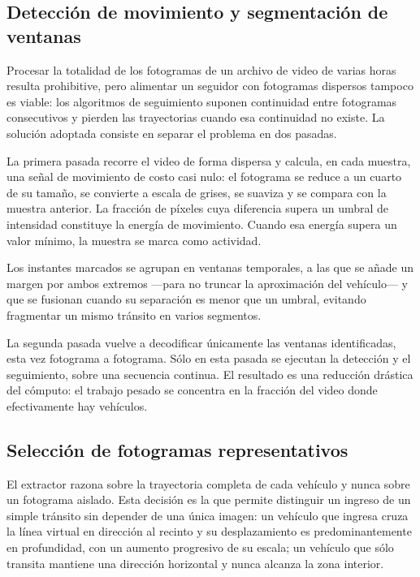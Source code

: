 \subsection{Detección de movimiento y segmentación de ventanas}

Procesar la totalidad de los fotogramas de un archivo de video de varias horas
resulta prohibitive, pero alimentar un seguidor con fotogramas dispersos tampoco
es viable: los algoritmos de seguimiento suponen continuidad entre fotogramas
consecutivos y pierden las trayectorias cuando esa continuidad no existe. La
solución adoptada consiste en separar el problema en dos pasadas.

La primera pasada recorre el video de forma dispersa y calcula, en cada muestra,
una señal de movimiento de costo casi nulo: el fotograma se reduce a un cuarto de
su tamaño, se convierte a escala de grises, se suaviza y se compara con la muestra
anterior. La fracción de píxeles cuya diferencia supera un umbral de intensidad
constituye la energía de movimiento. Cuando esa energía supera un valor mínimo, la
muestra se marca como actividad.

Los instantes marcados se agrupan en ventanas temporales, a las que se añade un
margen por ambos extremos ---para no truncar la aproximación del vehículo--- y que
se fusionan cuando su separación es menor que un umbral, evitando fragmentar un
mismo tránsito en varios segmentos.

La segunda pasada vuelve a decodificar únicamente las ventanas
identificadas, esta vez fotograma a fotograma. Sólo en esta pasada se ejecutan la
detección y el seguimiento, sobre una secuencia continua. El resultado es una
reducción drástica del cómputo: el trabajo pesado se concentra en la fracción del
video donde efectivamente hay vehículos.

\subsection{Selección de fotogramas representativos}

El extractor razona sobre la trayectoria completa de cada vehículo y nunca sobre
un fotograma aislado. Esta decisión es la que permite distinguir un ingreso de un
simple tránsito sin depender de una única imagen: un vehículo que ingresa cruza la
línea virtual en dirección al recinto y su desplazamiento es predominantemente en
profundidad, con un aumento progresivo de su escala; un vehículo que sólo transita
mantiene una dirección horizontal y nunca alcanza la zona interior.

